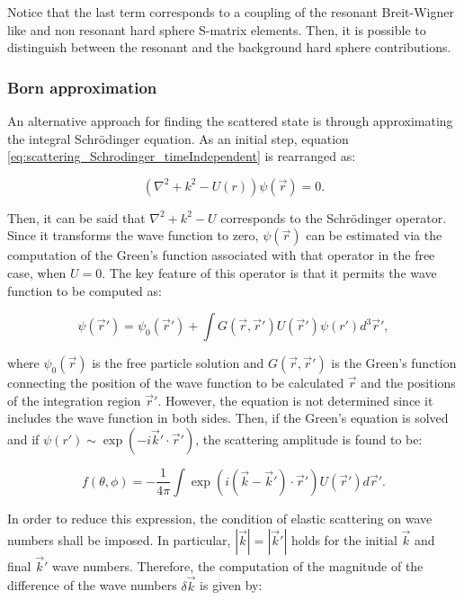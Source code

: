 \documentclass[openany]{book}
\begin{document}
Notice that the last term corresponds to a coupling of the resonant Breit-Wigner like and non resonant hard sphere S-matrix elements. Then, it is possible to distinguish between the resonant  and the background hard sphere contributions.
 
\subsubsection{Born approximation} \label{ssub:scattering_born}

An alternative approach for finding the scattered state is through approximating the integral Schrödinger equation. As an initial step, equation \ref{eq:scattering_Schrodinger_timeIndependent} is rearranged as:

\begin{equation} \label{eq:bornApproximation_operator}
 	(\nabla^2  + k^2 - U(r))\psi(\vec r) = 0.
\end{equation}

Then, it can be said that $\nabla^2 + k^2 - U$ corresponds to the Schrödinger operator. Since it transforms the wave function to zero,  $\psi(\vec r)$ can be estimated via the computation of the Green's function associated with that operator in the free case, when $U = 0$. The key feature of this operator is that it permits the wave function to be computed as: 

\begin{equation} \label{eq:bornApproximation_greenFunction}
		\psi(\vec r') = \psi_0(\vec r') + \int {G(\vec r, \vec r') U(\vec r')\psi(r') d^3\vec r'},
\end{equation}

where $\psi_0(\vec r)$ is the free particle solution and $G(\vec r, \vec r')$ is the Green's function connecting the position of the wave function to be calculated $\vec r$ and the positions of the integration region  $\vec r'$.  However, the equation is not determined since it includes the wave function in both sides. Then, if the Green's equation is solved and  if $\psi(r') \sim \exp(-i\vec k' \cdot \vec r')$, the scattering amplitude is found to be: 

 \begin{equation} \label{eq:bornApproximation_equation}
	f(\theta, \phi) = - \frac{1}{4\pi} \int {\exp { (i(\vec k - \vec k ' )\cdot \vec r ' )} U(\vec r') d\vec r'}.
 \end{equation}

In order to reduce this expression, the condition of elastic scattering on wave numbers shall be imposed. In particular, $|\vec k| = |\vec k'| $ holds for the initial $\vec k$ and final $\vec k'$ wave numbers. Therefore, the computation of the magnitude of the difference of the wave numbers $\delta \vec k$ is given by: 
\end{document}
